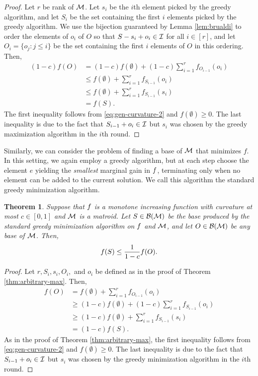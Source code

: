 \documentclass{article}
\newtheorem{theorem}{Theorem}[section]
\theoremstyle{definition}
\begin{document}
\begin{proof}
Let $r$ be rank of $\mathcal{M}$.  Let $s_i$ be the $i$th element picked by the greedy algorithm, and let $S_i$ be the set containing the first $i$ elements picked by the greedy algorithm.  We use the bijection guaranteed by Lemma \ref{lem:brualdi} to order the elements of $o_i$ of $O$ so that $S - s_i  + o_i \in \mathcal{I}$ for all $i \in [r]$, and let $O_i = \{o_j : j \le i\}$ be the set containing the first $i$ elements of $O$ in this ordering.  Then, 
\begin{align*}
(1-c)f(O) &= (1-c)f(\emptyset) + (1-c)\sum_{i = 1}^rf_{O_{i-1}}(o_i) \\
&\le f(\emptyset) + \sum_{i = 1}^rf_{S_{i-1}}(o_i) \\
&\le f(\emptyset) + \sum_{i = 1}^rf_{S_{i-1}}(s_i) \\
&= f(S).
\end{align*}
The first inequality follows from \eqref{eq:gen-curvature-2} and $f(\emptyset) \ge 0$.  The last inequality is due to the fact that $S_{i-1} + o_i \in \mathcal{I}$ but $s_i$ was chosen by the greedy maximization algorithm in the $i$th round.
\end{proof}

Similarly, we can consider the problem of finding a base of $\mathcal{M}$ that minimizes $f$.  In this setting, we again employ a greedy algorithm, but at each step choose the element $e$ yielding the \emph{smallest} marginal gain in $f$, terminating only when no element can be added to the current solution.  We call this algorithm the standard greedy minimization algorithm.

\begin{theorem}
\label{thm:arbitrary-min}
Suppose that $f$ is a monotone increasing function with curvature at most $c \in [0,1]$ and $\mathcal{M}$ is a matroid.  Let $S \in \mathcal{B}(\mathcal{M})$ be the base produced by the standard greedy minimization algorithm on $f$ and $\mathcal{M}$, and let $O \in \mathcal{B}(\mathcal{M})$ be any base of $\mathcal{M}$.  Then,
\[
f(S) \le \frac{1}{1-c}f(O).
\]
\end{theorem}
\begin{proof}
Let $r, S_i, s_i, O_i,$ and $o_i$ be defined as in the proof of Theorem \ref{thm:arbitrary-max}.  Then, 
\begin{align*}
f(O) &= f(\emptyset) + \sum_{i=1}^rf_{O_{i-1}}(o_i) \\
&\ge  (1-c)f(\emptyset) + (1-c)\sum_{i = 1}^rf_{S_{i-1}}(o_i) \\
&\ge  (1-c)f(\emptyset) + \sum_{i = 1}^rf_{S_{i-1}}(s_i) \\
&= (1-c)f(S).
\end{align*}
As in the proof of Theorem \ref{thm:arbitrary-max}, the first inequality follows from \eqref{eq:gen-curvature-2} and $f(\emptyset) 
\ge 0$.  The last inequality is due to the fact that $S_{i-1} + o_i \in \mathcal{I}$ but $s_i$ was chosen by the greedy minimization algorithm in the $i$th round.
\end{proof}
\end{document}
